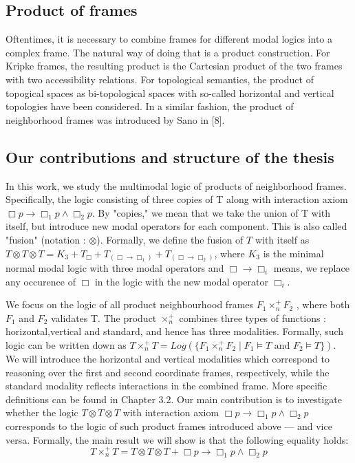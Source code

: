 \documentclass[12pt, a4paper]{scrartcl}
\begin{document}
\subsection{Product of frames}
Oftentimes, it is necessary to combine frames for different modal logics into a complex
frame. The natural way of doing that is a product construction. For Kripke frames,
the resulting product is the Cartesian product of the two frames with two accessibility
relations. For topological semantics, the product of topogical spaces as bi-topological
spaces with so-called horizontal and vertical topologies have been considered. In a similar
fashion, the product of neighborhood frames was introduced by Sano in [8]. 
\subsection{Our contributions and structure of the thesis}
In this work, we study the multimodal logic of products of neighborhood frames. Specifically, the logic consisting of three copies of T along with interaction axiom $\Box p \rightarrow \Box_1 p \land \Box_2 p$. 
By "copies," we mean that we take the union of T with itself, but introduce new modal operators for each component. This is also called "fusion" (notation : $\otimes$).
Formally, we define the fusion of $T$ with itself as $T \otimes T \otimes T = K_3 + T_{\Box} + T_{(\Box \rightarrow \Box_1)} + T_{(\Box \rightarrow \Box_2)}$, where $K_3$ 
is the minimal normal modal logic with three modal operators and $\Box \rightarrow \Box_i$ means, we replace any occurence of $\Box$ in the logic with the new modal operator $\Box_i$.  

We focus on the logic of all product neighbourhood frames $F_1 \times^+_n F_2$ , where both $F_1$ and $F_2$ validates T.
The product $\times^+_n$ combines three types of functions : horizontal,vertical and standard, and hence has three modalities. Formally, such logic can be written down as $T \times^+_n T = Log(\{F_1 \times^+_n F_2 \mid F_1 \vDash T \mbox{ and } F_2 \vDash T\})$.
We will introduce the horizontal and vertical modalities which correspond to reasoning over the first and second coordinate frames, respectively,
while the standard modality reflects interactions in the combined frame. \newline More specific definitions can be found in Chapter 3.2. \newline
Our main contribution is to investigate whether the logic $T \otimes T \otimes T$ with interaction axiom $\Box p \rightarrow \Box_1 p \land \Box_2 p$ 
corresponds to the logic of such product frames  introduced above — and vice versa. Formally, the main result we will show is that the following equality holds:
$$T \times^+_n T = T \otimes T \otimes T + \Box p \rightarrow \Box_1 p \land \Box_2 p $$
\end{document}
